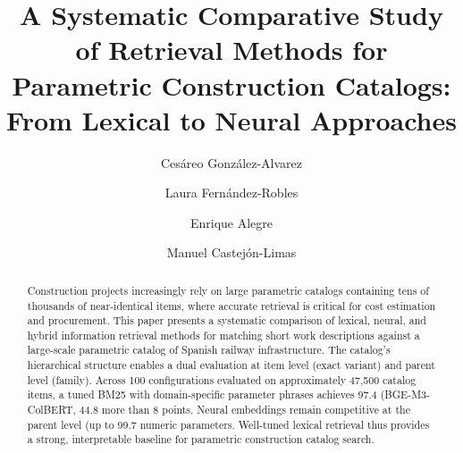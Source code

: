 \documentclass[preprint,12pt]{elsarticle}
\begin{document}
\linenumbers
\begin{frontmatter}


\title{A Systematic Comparative Study of Retrieval Methods for Parametric Construction Catalogs: From Lexical to Neural Approaches}

\author[deptA,b]{Cesáreo González-Alvarez}

\author[deptA]{Laura Fernández-Robles}
\author[deptA]{Enrique Alegre}
\author[deptA]{Manuel Castejón-Limas}


\begin{abstract}

Construction projects increasingly rely on large parametric catalogs containing tens
of thousands of near-identical items, where accurate retrieval is critical for cost
estimation and procurement. This paper presents a systematic comparison of lexical,
neural, and hybrid information retrieval methods for matching short work descriptions
against a large-scale parametric catalog of Spanish railway infrastructure. The
catalog's hierarchical structure enables a dual evaluation at item level (exact
variant) and parent level (family). Across 100 configurations evaluated on
approximately 47,500 catalog items, a tuned BM25 with domain-specific parameter
phrases achieves 97.4%
(BGE-M3-ColBERT, 44.8%
more than 8 points. Neural embeddings remain competitive at the parent level (up to
99.7%
numeric parameters. Well-tuned lexical retrieval thus provides a strong, interpretable
baseline for parametric construction catalog search.


\end{abstract}
\end{frontmatter}
\end{document}
